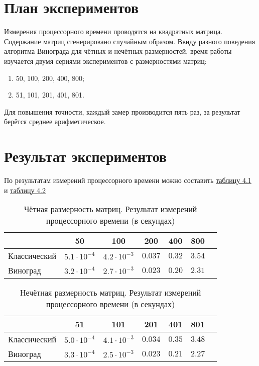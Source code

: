 \section{План экспериментов}
Измерения процессорного времени проводятся на квадратных матрица. Содержание матриц сгенерировано случайным образом. Ввиду разного поведения алгоритма Винограда для чётных и нечётных размерностей, время работы изучается двумя сериями экспериментов с размерностями матриц:
\begin{enumerate}
	\item 50, 100, 200, 400, 800;
	\item 51, 101, 201, 401, 801.
\end{enumerate}

Для повышения точности, каждый замер производится пять раз, за результат берётся среднее арифметическое.


\section{Результат экспериментов}
По результатам измерений процессорного времени можно составить \hyperref[table_4_1]{таблицу 4.1} и \hyperref[table_4_2]{таблицу 4.2}

\begin{table}[h] \label{table_4_1}
\caption{Чётная размерность матриц. Результат измерений процессорного времени (в секундах)}
\begin{tabular}{| p{3.5cm} | c | c | c | c | c | c |}
	\hline
					& 50				&100				&200			&400		&800	\\
	\hline\hline
	Классический	&$5.1\cdot10^{-4}$	&$4.2\cdot10^{-3}$	&$0.037$		&$0.32$		&$3.54$	\\
	\hline
	Виноград		&$3.2\cdot10^{-4}$	&$2.7\cdot10^{-3}$	&$0.023$		&$0.20$		&$2.31$	\\
	\hline
\end{tabular}
\end{table}


\begin{table}[h] \label{table_4_2}
	\caption{Нечётная размерность матриц. Результат измерений процессорного времени (в секундах)}
	\begin{tabular}{| p{3.5cm} | c | c | c | c | c | c |}
		\hline
						& 51				&101				&201			&401		&801	\\
		\hline\hline
		Классический	&$5.0\cdot10^{-4}$	&$4.1\cdot10^{-3}$	&$0.034$		&$0.35$		&$3.48$	\\
		\hline
		Виноград		&$3.3\cdot10^{-4}$	&$2.5\cdot10^{-3}$	&$0.023$		&$0.21$		&$2.27$	\\
		\hline
	\end{tabular}
\end{table}

